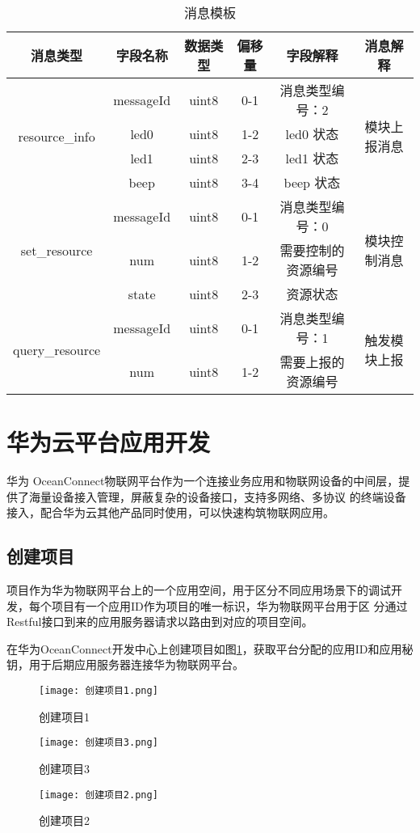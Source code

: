 \begin{table}[h]
\caption{消息模板}
\begin{tabular}{|c|c|c|c|c|c|}
\toprule
消息类型 & 字段名称 & 数据类型 & 偏移量 & 字段解释 & 消息解释 \\
\hline
\multirow{4}{*}{resource\_info} & messageId & uint8 & 0-1 & 消息类型编号：2 & \multirow{4}{*}{模块上报消息} \\
\cmidrule{2-5}
& led0 & uint8 & 1-2 & led0 状态 & \\
\cmidrule{2-5}
& led1 & uint8 & 2-3 & led1 状态 & \\
\cmidrule{2-5}
& beep & uint8 & 3-4 & beep 状态 & \\
\hline
\multirow{3}{*}{set\_resource} & messageId & uint8 & 0-1 & 消息类型编号：0 & \multirow{3}{*}{模块控制消息} \\
\cmidrule{2-5}
& num & uint8 & 1-2 & 需要控制的资源编号 & \\
\cmidrule{2-5}
& state & uint8 & 2-3 & 资源状态 & \\
\hline
\multirow{3}{*}{query\_resource} & messageId & uint8 & 0-1 & 消息类型编号：1 & \multirow{3}{*}{触发模块上报} \\
\cmidrule{2-5}
& num & uint8 & 1-2 & 需要上报的资源编号 & \\
\bottomrule
\end{tabular}
\label{消息模板}
\end{table}

\section{华为云平台应用开发}
华为 OceanConnect物联网平台作为一个连接业务应用和物联网设备的中间层，提供了海量设备接入管理，屏蔽复杂的设备接口，支持多网络、多协议
的终端设备接入，配合华为云其他产品同时使用，可以快速构筑物联网应用。

\subsection{创建项目}
项目作为华为物联网平台上的一个应用空间，用于区分不同应用场景下的调试开发，每个项目有一个应用ID作为项目的唯一标识，华为物联网平台用于区
分通过Restful接口到来的应用服务器请求以路由到对应的项目空间。

在华为OceanConnect开发中心上创建项目如图\ref{创建项目1}，获取平台分配的应用ID和应用秘钥，用于后期应用服务器连接华为物联网平台。
\begin{figure}[H]
    \centering
	\texttt{[image: 创建项目1.png]}
	\caption{创建项目1}
	\label{创建项目1}
\end{figure}
\begin{figure}[H]
    \centering
	\texttt{[image: 创建项目3.png]}
	\caption{创建项目3}
	\label{创建项目3}
\end{figure}
\begin{figure}[H]
    \centering
	\texttt{[image: 创建项目2.png]}
	\caption{创建项目2}
	\label{创建项目2}
\end{figure}


